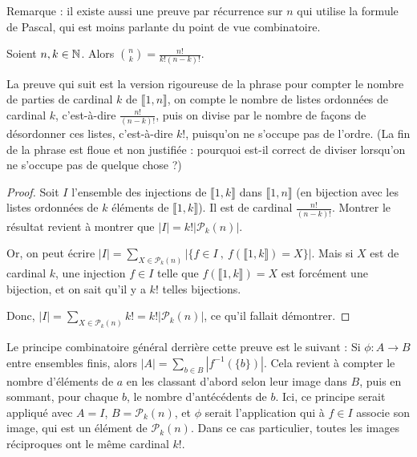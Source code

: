 Remarque : il existe aussi une preuve par récurrence sur $n$ qui utilise la formule de Pascal, qui est moins parlante du point de vue combinatoire.

\begin{proposition}Soient $n, k\in \mathbb{N}$. Alors $\binom{n}{k} = \frac{n!}{k!(n-k)!}$.
\end{proposition}

La preuve qui suit est la version rigoureuse de la phrase \og pour compter le nombre de parties de cardinal $k$ de $\llbracket 1,n\rrbracket$, on compte le nombre de  listes ordonnées de cardinal $k$, c'est-à-dire $\frac{n!}{(n-k)!}$, puis on divise par le nombre de façons de désordonner ces listes, c'est-à-dire $k!$, puisqu'on ne s'occupe pas de l'ordre\fg. (La fin de la phrase est floue et non justifiée : pourquoi est-il correct de \og diviser\fg{} lorsqu'on ne \og s'occupe pas\fg{} de quelque chose ?)

\begin{proof} 

Soit $I$ l'ensemble des injections de $\llbracket 1,k\rrbracket$ dans $\llbracket 1,n\rrbracket$ (en bijection avec les listes ordonnées de $k$ éléments de $\llbracket 1,k\rrbracket$). Il est de cardinal $\frac{n!}{(n-k)!}$. Montrer le résultat revient à montrer que $|I| = k! |\mathcal P_k(n)|$.

Or, on peut écrire $|I| = \sum_{X\in \mathcal P_k(n)} \left| \{f\in I\:,\: f(\llbracket 1,k\rrbracket)=X\}\right|$. Mais si $X$ est de cardinal $k$, une injection $f\in I$ telle que  $f(\llbracket 1,k\rrbracket)=X$ est forcément une bijection, et on sait qu'il y a $k!$ telles bijections.

Donc, $|I| = \sum_{X\in \mathcal P_k(n)} k! = k! |\mathcal P_k(n)|$, ce qu'il fallait démontrer.
\end{proof}

\begin{remarque}
Le principe combinatoire général derrière cette preuve est le suivant : Si $\phi : A\to B$ entre ensembles finis, alors $|A| = \sum_{b\in B} \left|f^{-1}(\{b\})\right|$. Cela revient à compter le nombre d'éléments de $a$ en les classant d'abord selon leur image dans $B$, puis en sommant, pour chaque $b$, le nombre d'antécédents de $b$. Ici, ce principe serait appliqué avec $A=I$, $B=\mathcal P_k(n)$, et $\phi$ serait l'application qui à $f\in I$ associe son image, qui est un élément de $\mathcal P_k(n)$. Dans ce cas particulier, toutes les images réciproques ont le même cardinal $k!$.
\end{remarque}


